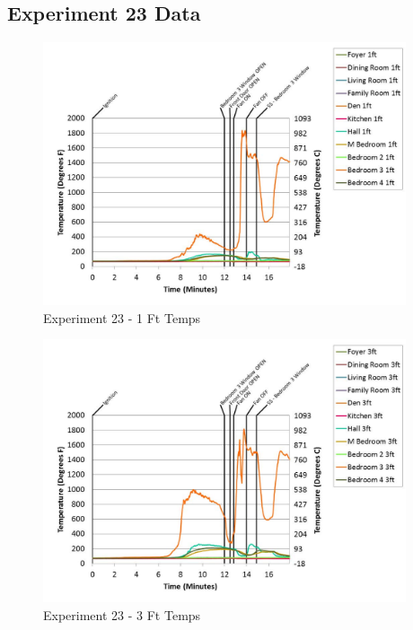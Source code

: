 \documentclass{article}
\begin{document}
\begin{appendices}
	\clearpage

		\clearpage
\clearpage		\large
\subsection{Experiment 23 Data} \label{App:Exp23Results} 

	\begin{figure}[h!]
		\centering
		\includegraphics[height=3.05in]{0_Images/Results_Charts/Exp_23_Charts/1FtTemps.pdf}
		\caption{Experiment 23 - 1 Ft Temps}
	\end{figure}
 

	\begin{figure}[h!]
		\centering
		\includegraphics[height=3.05in]{0_Images/Results_Charts/Exp_23_Charts/3FtTemps.pdf}
		\caption{Experiment 23 - 3 Ft Temps}
	\end{figure}
 
	\clearpage


\end{appendices}
\end{document}
